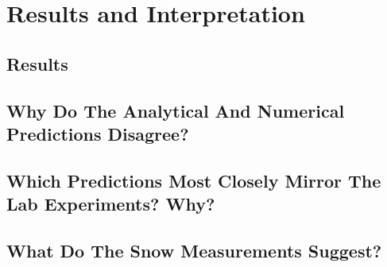 \chapter{Results and Interpretation}

\section{Results}

\section{Why Do The Analytical And Numerical Predictions Disagree?}

\section{Which Predictions Most Closely Mirror The Lab Experiments? Why?}

\section{What Do The Snow Measurements Suggest?}
